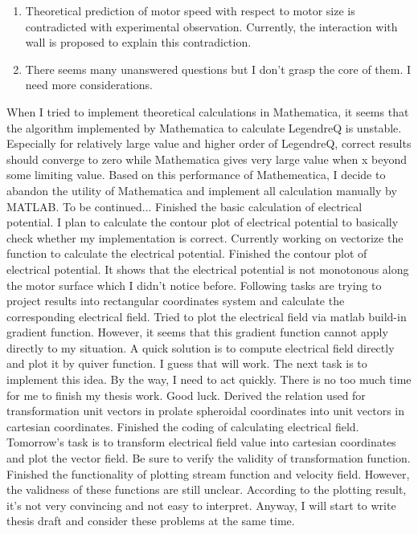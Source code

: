 \documentclass[fontsize=11pt, %
                             paper=a4, %
                             twoside, %
                             captions=tableheading,
                             index=totoc,
                             hyperref]{labbook}
\begin{document}
\begin{addmargin}[4cm]{0cm}
\begin{itemize}
\begin{enumerate}
\item
Theoretical prediction of motor speed with respect to motor size is contradicted with experimental observation. Currently, the interaction with wall is proposed to explain this contradiction.
\item There seems many unanswered questions but I don't grasp the core of them. I need more considerations. 
\end{enumerate}
\end{itemize}
When I tried to implement theoretical calculations in Mathematica, it seems that the algorithm implemented by Mathematica to calculate LegendreQ is unstable. Especially for relatively large value and higher order of LegendreQ, correct results should converge to zero while Mathematica gives very large value when x beyond some limiting value. Based on this performance of Mathemeatica, I decide to abandon the utility of Mathematica and implement all calculation manually by MATLAB. To be continued...
Finished the basic calculation of electrical potential. I plan to calculate the contour plot of electrical potential to basically check whether my implementation is correct. Currently working on vectorize the function to calculate the electrical potential.
Finished the contour plot of electrical potential. It shows that the electrical potential is not monotonous along the motor surface which I didn't notice before. Following tasks are trying to project results into rectangular coordinates system and calculate the corresponding electrical field.
Tried to plot the electrical field via matlab build-in gradient function. However, it seems that this gradient function cannot apply directly to my situation. A quick solution is to compute electrical field directly and plot it by quiver function. I guess that will work. The next task is to implement this idea. By the way, I need to act quickly. There is no too much time for me to finish my thesis work. Good luck.
Derived the relation used for transformation unit vectors in prolate spheroidal coordinates into unit vectors in cartesian coordinates. Finished the coding of calculating electrical field. Tomorrow's task is to transform electrical field value into cartesian coordinates and plot the vector field. Be sure to verify the validity of transformation function.
Finished the functionality of plotting stream function and velocity field. However, the validness of these functions are still unclear. According to the plotting result, it's not very convincing and not easy to interpret. Anyway, I will start to write thesis draft and consider these problems at the same time.

\end{addmargin}
\end{document}
